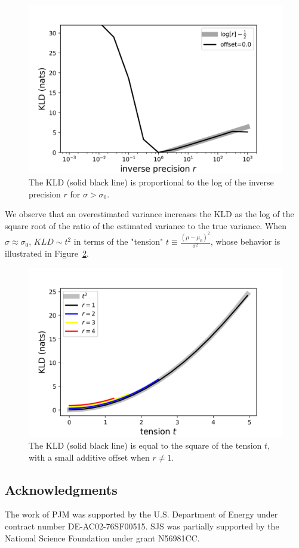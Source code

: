 \documentclass[\docopts]{\docclass}
\begin{document}
\begin{figure}
  \includegraphics[width=0.9\columnwidth]{figures/kld_precision.png}
  \caption{The KLD (solid black line) is proportional to the log of the inverse 
precision $r$ for $\sigma>\sigma_{0}$.
  \label{fig:precision}}
\end{figure}

We observe that an overestimated variance increases the KLD as the log of the 
square root of the ratio of the estimated variance to the true variance.
When $\sigma\approx\sigma_{0}$, $KLD\sim t^{2}$ in terms of the "tension" 
$t\equiv\frac{(\mu-\mu_{0})^{2}}{\sigma^{2}}$, whose behavior is illustrated in 
Figure~\ref{fig:tension}.

\begin{figure}
  \includegraphics[width=0.9\columnwidth]{figures/kld_tension.png}
  \caption{The KLD (solid black line) is equal to the square of the tension 
$t$, with a small additive offset when $r\neq1$.
  \label{fig:tension}}
\end{figure}

\subsection*{Acknowledgments}


The work of PJM was supported by the U.S. Department of Energy under contract 
number DE-AC02-76SF00515.
SJS was partially supported by the National Science Foundation under grant 
N56981CC.








\end{document}
